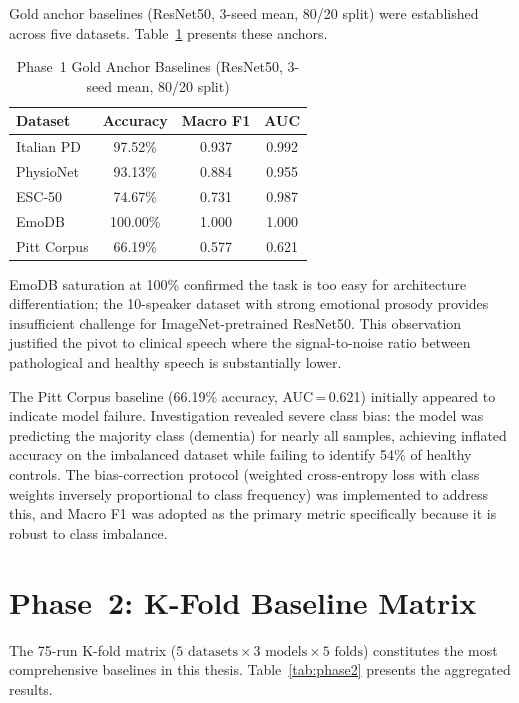 \documentclass[oneside,openany]{final_report}
\begin{document}
Gold anchor baselines (ResNet50, 3-seed mean, 80/20 split) were established across five datasets. Table~\ref{tab:phase1} presents these anchors.

\begin{table}[H]
\centering
\caption{Phase~1 Gold Anchor Baselines (ResNet50, 3-seed mean, 80/20 split)}
\label{tab:phase1}
\begin{tabular}{l c c c}
\toprule
\textbf{Dataset} & \textbf{Accuracy} & \textbf{Macro F1} & \textbf{AUC} \\
\midrule
Italian PD & 97.52\% & 0.937 & 0.992 \\
PhysioNet & 93.13\% & 0.884 & 0.955 \\
ESC-50 & 74.67\% & 0.731 & 0.987 \\
EmoDB & 100.00\% & 1.000 & 1.000 \\
Pitt Corpus & 66.19\% & 0.577 & 0.621 \\
\bottomrule
\end{tabular}
\end{table}

EmoDB saturation at 100\% confirmed the task is too easy for architecture differentiation; the 10-speaker dataset with strong emotional prosody provides insufficient challenge for ImageNet-pretrained ResNet50. This observation justified the pivot to clinical speech where the signal-to-noise ratio between pathological and healthy speech is substantially lower.

The Pitt Corpus baseline (66.19\% accuracy, AUC\,=\,0.621) initially appeared to indicate model failure. Investigation revealed severe class bias: the model was predicting the majority class (dementia) for nearly all samples, achieving inflated accuracy on the imbalanced dataset while failing to identify 54\% of healthy controls. The bias-correction protocol (weighted cross-entropy loss with class weights inversely proportional to class frequency) was implemented to address this, and Macro F1 was adopted as the primary metric specifically because it is robust to class imbalance.

\section{Phase~2: K-Fold Baseline Matrix}

The 75-run K-fold matrix ($5 \text{ datasets} \times 3 \text{ models} \times 5 \text{ folds}$) constitutes the most comprehensive baselines in this thesis. Table~\ref{tab:phase2} presents the aggregated results.
\end{document}

